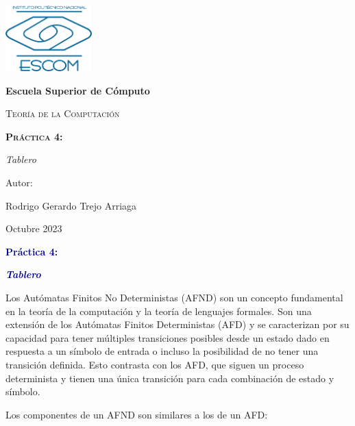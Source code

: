 \documentclass[11pt]{article} %
\begin{document}
	
	\begin{titlepage}
		\centering
		{\includegraphics[width=0.25\textwidth]{descarga}\par}
		\vspace{0.5cm}
		{\bfseries\huge Escuela Superior de Cómputo \par}
		\vspace{0.7cm}
		{\scshape\LARGE Teoría de la Computación \par}
		\vspace{0.3cm}
		\vspace{3.1cm}
		{\scshape \Huge \textbf{Práctica 4:}  \par}
		\vspace{0.03cm}
		{{\LARGE \textit{Tablero}} \par}
		\vspace{3.5cm}
		{\Large Autor: \par}
		{\Large Rodrigo Gerardo Trejo Arriaga \par}
		\vspace{3cm}
		{\Large Octubre 2023 \par}
	\end{titlepage}
	
	\begin{center}
		\vspace*{0.1cm}
		{\huge \textcolor{darkBlue}{\textbf{Práctica 4:}} \par}
		
		{\Large \textcolor{darkBlue}{\textbf{\textit{Tablero}}}}
	\end{center}
	

Los Autómatas Finitos No Deterministas (AFND) son un concepto fundamental en la teoría de la computación y la teoría de lenguajes formales. Son una extensión de los Autómatas Finitos Deterministas (AFD) y se caracterizan por su capacidad para tener múltiples transiciones posibles desde un estado dado en respuesta a un símbolo de entrada o incluso la posibilidad de no tener una transición definida. Esto contrasta con los AFD, que siguen un proceso determinista y tienen una única transición para cada combinación de estado y símbolo.


Los componentes de un AFND son similares a los de un AFD:
\end{document}
